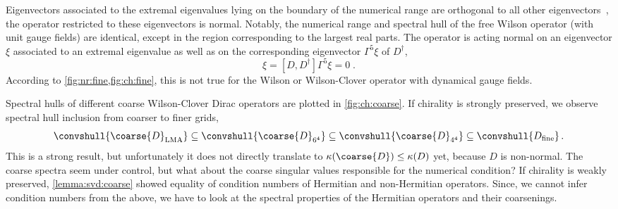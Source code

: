 Eigenvectors associated to the extremal eigenvalues lying on the boundary of the numerical range are orthogonal to all other eigenvectors~\cite{gustafson1997numerical}, \ie the operator restricted to these eigenvectors is normal.
Notably, the numerical range and spectral hull of the free Wilson operator (with unit gauge fields) are identical, except in the region corresponding to the largest real parts.
The operator is acting normal on an eigenvector $\xi$ associated to an extremal eigenvalue as well as on the corresponding eigenvector $\Gamma^{5} \xi$ of $D^{\dagger}$,
\begin{equation}
[ D, D^{\dagger} ] \xi = [ D, D^{\dagger} ] \Gamma^{5} \xi = 0 \;.
\end{equation}
According to \cref{fig:nr:fine,fig:ch:fine}, this is not true for the Wilson or Wilson-Clover operator with dynamical gauge fields.

Spectral hulls of different coarse Wilson-Clover Dirac operators are plotted in \cref{fig:ch:coarse}.
If chirality is strongly preserved, we observe spectral hull inclusion from coarser to finer grids,
\begin{equation}
\convshull{\coarse{D}_{\text{LMA}}} \subseteq
\convshull{\coarse{D}_{6^{4}}} \subseteq
\convshull{\coarse{D}_{4^{4}}} \subseteq
\convshull{D_{\text{fine}}} \,.
\end{equation}
This is a strong result, but unfortunately it does not directly translate to $\kappa(\coarse{D}) \leq \kappa(D)$ yet, because $D$ is non-normal.
The coarse spectra seem under control, but what about the coarse singular values responsible for the numerical condition?
If chirality is weakly preserved, \cref{lemma:svd:coarse} showed equality of condition numbers of Hermitian and non-Hermitian operators.
Since, we cannot infer condition numbers from the above, we have to look at the spectral properties of the Hermitian operators and their coarsenings.


